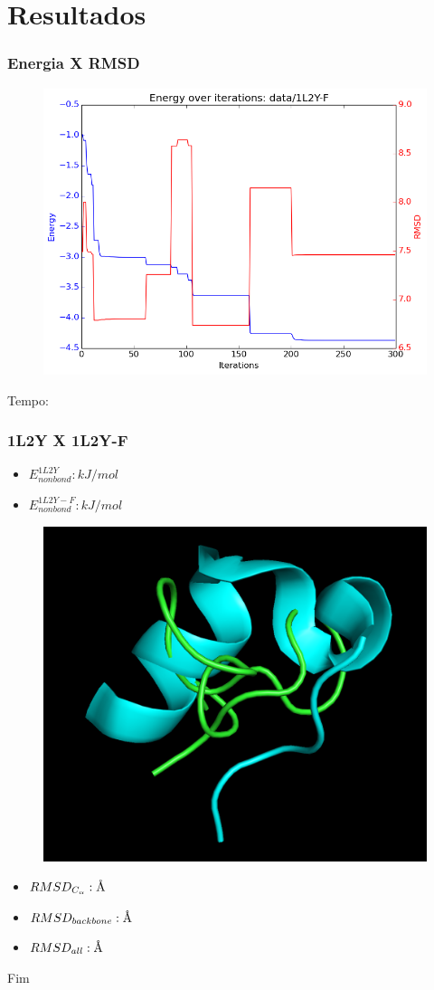 \documentclass{beamer}
\newcommand{\angstrom}{\textup{\AA}}
\begin{document}
\section{Resultados} %

\begin{frame}
\frametitle{Energia X RMSD}
\begin{figure}
\includegraphics[width=0.7\linewidth]{1L2Y-F_energy.png}
\end{figure}
Tempo:
\end{frame}

\begin{frame}
\frametitle{1L2Y X 1L2Y-F}
\begin{itemize}
  \item $E_{nonbond}^{1L2Y}: kJ/mol$
  \item $E_{nonbond}^{1L2Y-F}: kJ/mol$
\end{itemize} 
\begin{figure}
\includegraphics[width=0.4\linewidth]{1L2Y-F.png}
\end{figure}
\begin{itemize}
  \item $RMSD_{C_\alpha}: \angstrom$
  \item $RMSD_{backbone}: \angstrom$
  \item $RMSD_{all}: \angstrom$ 
\end{itemize}
\end{frame}

\begin{frame}
\Huge{\centerline{Fim}}
\end{frame}

\end{document}
